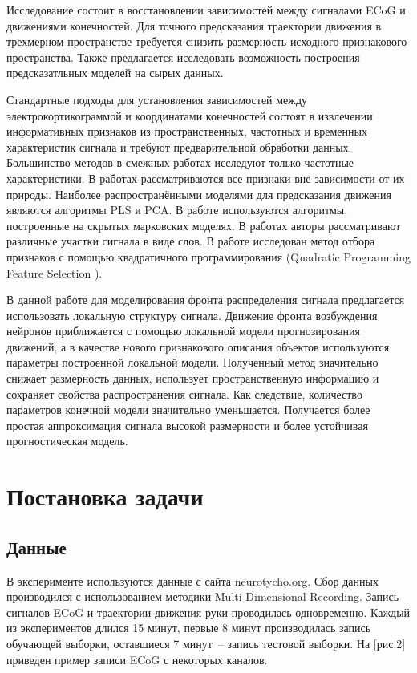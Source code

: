 \documentclass{mipt-thesis-bs}
\begin{document}
Исследование состоит в восстановлении зависимостей между сигналами ECoG и движениями конечностей. Для точного предсказания траектории движения в трехмерном пространстве требуется снизить размерность исходного признакового пространства. Также предлагается исследовать возможность построения предсказатльных моделей на сырых данных.

Стандартные подходы для установления зависимостей между электрокортикограммой и координатами конечностей состоят в извлечении информативных признаков из пространственных, частотных и временных характеристик сигнала\cite{Morishita2014,Alexander2013} и требуют предварительной обработки данных. Большинство методов в смежных работах исследуют только частотные характеристики\cite{Chin2007,Eliseyev2014,Loza2017}. В работах \cite{Eliseyev2016,Motrenko2018} рассматриваются все признаки вне зависимости от их природы. Наиболее распространёнными моделями для предсказания движения являются алгоритмы PLS\cite{Rosipal2006,Eliseyev2016} и PCA\cite{Zhao2010,Song2017}. В работе \cite{Zhao2014} используются алгоритмы, построенные на скрытых марковских моделях. В  работах \cite{Loza2017,Song2017} авторы рассматривают различные участки сигнала в виде слов. В работе \cite{Motrenko2018} исследован метод отбора признаков с помощью квадратичного программирования (Quadratic Programming Feature Selection \cite{rodriguez2010quadratic}).

В данной работе для моделирования фронта распределения сигнала предлагается использовать локальную структуру сигнала. Движение фронта возбуждения нейронов приближается с помощью локальной модели прогнозирования движений, а в качестве нового признакового описания объектов используются параметры построенной локальной модели. Полученный  метод значительно снижает размерность данных, использует пространственную информацию и сохраняет свойства распространения сигнала.
Как следствие, количество параметров конечной модели значительно уменьшается. Получается более простая аппроксимация сигнала высокой размерности и более устойчивая прогностическая модель.

\chapter{Постановка задачи}


\section{Данные}

В эксперименте используются данные с сайта neurotycho.org. Сбор данных производился с использованием методики Multi-Dimensional Recording. Запись сигналов ECoG и траектории движения руки проводилась одновременно. Каждый из экспериментов длился 15 минут, первые 8 минут производилась запись обучающей выборки, оставшиеся 7 минут~– запись тестовой выборки. На [рис.2] приведен пример записи ECoG с некоторых каналов.
\end{document}
